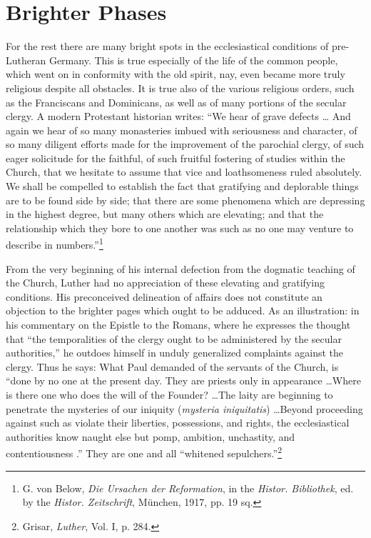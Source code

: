 \section{Brighter Phases}

For the rest there are many bright spots in the ecclesiastical conditions of pre-Lutheran Germany. This is true especially of the life
of the common people, which went on in conformity with the old
spirit, nay, even became more truly religious despite all obstacles. It
is true also of the various religious orders, such as the Franciscans and
Dominicans, as well as of many portions of the secular clergy. A
modern Protestant historian writes: “We hear of grave defects \dots
And again we hear of so many monasteries imbued with seriousness
and character, of so many diligent efforts made for the improvement of
the parochial clergy, of such eager solicitude for the faithful, of such
fruitful fostering of studies within the Church, that we
hesitate to assume that vice and loathsomeness ruled absolutely. We
shall be compelled to establish the fact that gratifying and deplorable
things are to be found side by side; that there are some phenomena
which are depressing in the highest degree, but many others which are
elevating; and that the relationship which they bore to one another
was such as no one may venture to describe in numbers.”\footnote
{G. von Below, \textit{Die Ursachen der Reformation}, in the \textit{Histor. Bibliothek}, ed. by the
\textit{Histor. Zeitschrift}, München, 1917, pp. 19 sq.}

From the very beginning of his internal defection from the dogmatic teaching
of the Church, Luther had no appreciation of these
elevating and gratifying conditions. His preconceived delineation of
affairs does not constitute an objection to the brighter pages which
ought to be adduced.
As an illustration: in his commentary on the Epistle to the Romans,
where he expresses the thought that “the temporalities of the clergy ought
to be administered by the secular authorities,” he outdoes himself in unduly
generalized complaints against the clergy. Thus he says: What Paul demanded
of the servants of the Church, is “done by no one at the present
day. They are priests only in appearance \dots Where is there one who
does the will of the Founder? \dots The laity are beginning to penetrate
the mysteries of our iniquity (\textit{mysteria iniquitatis}) \dots Beyond proceeding
against such as violate their liberties, possessions, and rights, the ecclesiastical
authorities know naught else but pomp, ambition, unchastity, and contentiousness
.” They are one and all “whitened sepulchers.”\footnote{Grisar, \textit{Luther}, Vol. I, p. 284.}

